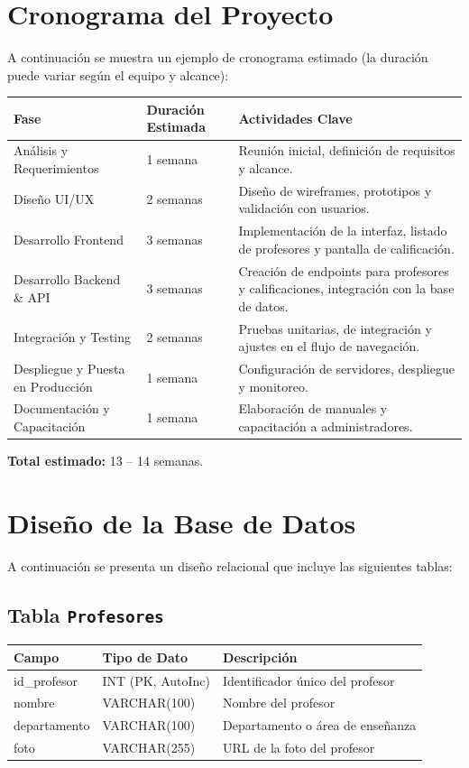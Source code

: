 \documentclass[11pt]{article}
\begin{document}
\newpage
\section{Cronograma del Proyecto}

A continuación se muestra un ejemplo de cronograma estimado (la duración puede variar según el equipo y alcance):

\begin{center}
\begin{tabularx}{\textwidth}{@{}lp{3cm}X@{}}
\toprule
\textbf{Fase} & \textbf{Duración Estimada} & \textbf{Actividades Clave} \\ \midrule
Análisis y Requerimientos & 1 semana & Reunión inicial, definición de requisitos y alcance. \\
Diseño UI/UX & 2 semanas & Diseño de wireframes, prototipos y validación con usuarios. \\
Desarrollo Frontend & 3 semanas & Implementación de la interfaz, listado de profesores y pantalla de calificación. \\
Desarrollo Backend \& API & 3 semanas & Creación de endpoints para profesores y calificaciones, integración con la base de datos. \\
Integración y Testing & 2 semanas & Pruebas unitarias, de integración y ajustes en el flujo de navegación. \\
Despliegue y Puesta en Producción & 1 semana & Configuración de servidores, despliegue y monitoreo. \\
Documentación y Capacitación & 1 semana & Elaboración de manuales y capacitación a administradores. \\ \bottomrule
\end{tabularx}
\end{center}

\noindent \textbf{Total estimado:} 13 -- 14 semanas.

\newpage
\section{Diseño de la Base de Datos}

A continuación se presenta un diseño relacional que incluye las siguientes tablas:

\subsection{Tabla \texttt{Profesores}}
\begin{center}
\begin{tabularx}{\textwidth}{@{}p{4cm}p{3cm}X@{}}
\toprule
\textbf{Campo} & \textbf{Tipo de Dato} & \textbf{Descripción} \\ \midrule
id\_profesor   & INT (PK, AutoInc)  & Identificador único del profesor \\
nombre         & VARCHAR(100)       & Nombre del profesor \\
departamento   & VARCHAR(100)       & Departamento o área de enseñanza \\
foto           & VARCHAR(255)       & URL de la foto del profesor \\ \bottomrule
\end{tabularx}
\end{center}
\end{document}
